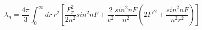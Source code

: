 \begin{equation}
\lambda_n= \frac{4 \pi}{3} \int_0^\infty dr~r^2 [ \frac{F_\pi^2}{2n^2} sin^2nF +\frac{2}{e^2} \frac{sin^2nF}{n^2} (2F'^2+\frac{sin^2nF}{n^2 r^2})] 
\end{equation}

